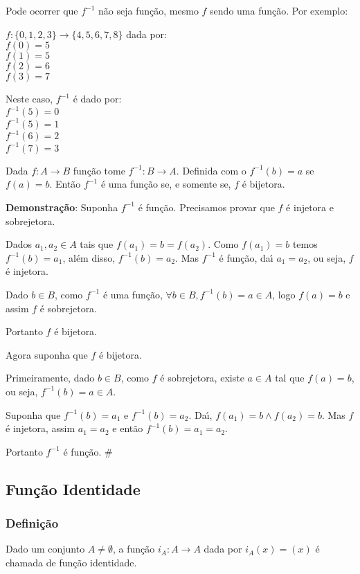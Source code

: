 Pode ocorrer que $f^{-1}$ n{\~a}o seja funç{\~a}o, mesmo $f$ sendo uma funç{\~a}o. Por exemplo:

$f:\{0,1,2,3\} \to\{4,5,6,7,8\}$ dada por:\\
$f(0)=5$\\
$f(1)=5$\\
$f(2)=6$\\
$f(3)=7$

Neste caso, $f^{-1}$ {\'e} dado por:\\
$f^{-1}(5)=0$\\
$f^{-1}(5)=1$\\
$f^{-1}(6)=2$\\
$f^{-1}(7)=3$

\begin{teorema}
Dada $f:A\rightarrow B$ fun{\c c}{\~a}o tome $f^{-1}:B\rightarrow A$. Definida com o $f^{-1}(b)=a$ se $f(a)=b$. Ent{\~a}o $f^{-1}$ {\'e} uma fun{\c c}{\~a}o se, e somente se, $f$ {\'e} bijetora.
\end{teorema}

\textbf{Demonstra{\c c}{\~a}o}: Suponha $f^{-1}$ {\'e} fun{\c c}{\~a}o. Precisamos provar que $f$ {\'e} injetora e sobrejetora.

Dados $a_{1},a_{2}\in A$ tais que $f(a_{1})=b=f(a_{2})$. Como $f(a_{1})=b$ temos $f^{-1}(b)=a_{1}$, al{\'e}m disso, $f^{-1}(b)=a_{2}$. Mas $f^{-1}$ {\'e} fun{\c c}{\~a}o, da{\'\i} $a_{1}=a_{2}$, ou seja, $f$ {\'e} injetora.

Dado $b\in B$, como $f^{-1}$ {\'e} uma fun{\c c}{\~a}o, $\forall b\in B, f^{-1}(b)=a\in A$, logo $f(a)=b$ e assim $f$ {\'e} sobrejetora.

Portanto $f$ {\'e} bijetora.

Agora suponha que $f$ {\'e} bijetora.

Primeiramente, dado $b\in B$, como $f$ {\'e} sobrejetora, existe $a\in A$ tal que $f(a)=b$, ou seja, $f^{-1}(b)=a\in A$.

Suponha que $f^{-1}(b)=a_{1}$ e $f^{-1}(b)=a_{2}$. Da{\'\i}, $f(a_{1})=b\wedge f(a_{2})=b$. Mas $f$ {\'e} injetora, assim $a_{1}=a_{2}$ e ent{\~a}o $f^{-1}(b)=a_{1}=a_{2}$.

Portanto $f^{-1}$ {\'e} fun{\c c}{\~a}o. \#



\subsection{Fun{\c c}{\~a}o Identidade}
\subsubsection{Defini{\c c}{\~a}o}
\begin{definicao} Dado um conjunto $A\neq\emptyset$, a fun{\c c}{\~a}o $i_{A}:A\rightarrow A$ dada por $i_{A}(x)=(x)$ {\'e} chamada de fun{\c c}{\~a}o identidade.\end{definicao}

